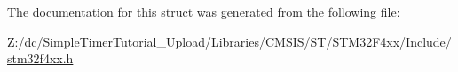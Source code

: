 The documentation for this struct was generated from the following file\-:\begin{DoxyCompactItemize}
\item 
Z\-:/dc/\-Simple\-Timer\-Tutorial\-\_\-\-Upload/\-Libraries/\-C\-M\-S\-I\-S/\-S\-T/\-S\-T\-M32\-F4xx/\-Include/\hyperlink{stm32f4xx_8h}{stm32f4xx.\-h}\end{DoxyCompactItemize}

